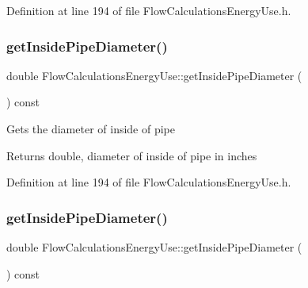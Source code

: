 Definition at line 194 of file Flow\+Calculations\+Energy\+Use.\+h.

\mbox{\label{class_flow_calculations_energy_use_a9042dce2938208358fe38ed8a726ca65}} 
\subsubsection{\texorpdfstring{get\+Inside\+Pipe\+Diameter()}{getInsidePipeDiameter()}\hspace{0.1cm}{\footnotesize\ttfamily [2/3]}}
{\footnotesize\ttfamily double Flow\+Calculations\+Energy\+Use\+::get\+Inside\+Pipe\+Diameter (\begin{DoxyParamCaption}{ }\end{DoxyParamCaption}) const\hspace{0.3cm}{\ttfamily [inline]}}

Gets the diameter of inside of pipe

\begin{DoxyReturn}{Returns}
double, diameter of inside of pipe in inches 
\end{DoxyReturn}


Definition at line 194 of file Flow\+Calculations\+Energy\+Use.\+h.

\mbox{\label{class_flow_calculations_energy_use_a9042dce2938208358fe38ed8a726ca65}} 
\subsubsection{\texorpdfstring{get\+Inside\+Pipe\+Diameter()}{getInsidePipeDiameter()}\hspace{0.1cm}{\footnotesize\ttfamily [3/3]}}
{\footnotesize\ttfamily double Flow\+Calculations\+Energy\+Use\+::get\+Inside\+Pipe\+Diameter (\begin{DoxyParamCaption}{ }\end{DoxyParamCaption}) const\hspace{0.3cm}{\ttfamily [inline]}}

